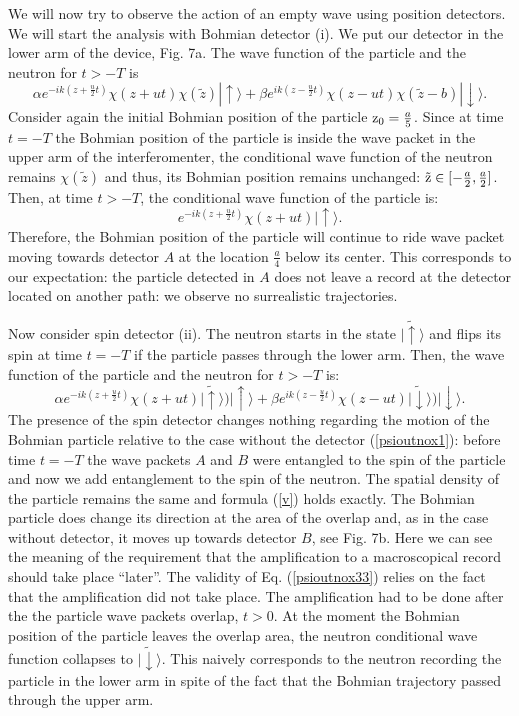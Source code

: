 \documentclass[12pt,preprint,tightenlines]{elsarticle}
\begin{document}
We will now try to observe the action of an empty wave using position
detectors. We will start the analysis with Bohmian detector (i). We
put our detector in the lower arm of the device, Fig. 7a. The wave
function of the particle and the neutron for $t>-T$ is
\begin{equation}
\alpha e^{-ik(z+\frac{u}{2}t)}\chi(z+ut)\chi(\tilde{z})|\uparrow\rangle+\beta e^{ik(z-\frac{u}{2}t)}\chi(z-ut)\chi(\tilde{z}-b)|\downarrow\rangle.\label{psioutnox2}
\end{equation}
 Consider again the initial Bohmian position of the particle ${\rm z_{0}}=\frac{a}{5}$.
Since at time $t=-T$ the Bohmian position of the particle is inside
the  wave packet in the upper arm of the interferomenter, the conditional wave function of the neutron
remains $\chi(\tilde{z})$ and thus, its Bohmian position remains
unchanged: ${\rm \tilde{z}}\in[-\frac{a}{2},\frac{a}{2}]$. Then,
at time $t>-T$, the conditional wave function of the particle is:
\begin{equation}
e^{-ik(z+\frac{u}{2}t)}\chi(z+ut)|\uparrow\rangle.\label{psiout55}
\end{equation}
 Therefore, the Bohmian position of the particle will continue to
ride wave packet moving towards detector $A$ at the location $\frac{a}{4}$ below its center. This corresponds to our expectation: the particle
detected in $A$ does not leave a record at the detector located on
another path: we observe no surrealistic trajectories.


Now consider spin detector (ii). The neutron starts in the state $|\tilde{\uparrow}\rangle$ and
flips its spin at time $t=-T$ if the particle passes through the lower arm. Then, the wave function of the particle and the neutron for
$t>-T$ is:
 \begin{equation}
\alpha e^{-ik(z+\frac{u}{2}t)}\chi(z+ut)|\tilde{\uparrow}\rangle)|\uparrow\rangle+\beta e^{ik(z-\frac{u}{2}t)}\chi(z-ut)|\tilde{\downarrow}\rangle)|\downarrow\rangle.\label{psioutnox33}
\end{equation}
 The presence of the spin detector changes nothing regarding the motion
of the Bohmian particle relative to the case without the detector (\ref{psioutnox1}):
before time $t=-T$ the wave packets $A$ and $B$ were entangled
to the spin of the particle and now we add entanglement to the spin
of the neutron. The spatial density of the particle remains the same
and formula (\ref{v}) holds exactly. The Bohmian particle does change
its direction at the area of the overlap and, as in
the case without detector, it moves up towards
detector $B$, see Fig. 7b.  Here we can see the meaning of the requirement that the amplification to a macroscopical record should take place ``later''. The validity of Eq. (\ref{psioutnox33}) relies on the fact that the amplification did not take place. The amplification had to be done after the   the particle wave packets overlap,  $t>0$. At the moment the Bohmian position of the particle leaves the overlap area, 
the neutron conditional wave function collapses to $|\tilde{\downarrow}\rangle$. This naively corresponds to the neutron recording the particle in 
the lower arm in spite of the fact that the Bohmian trajectory passed through the
upper arm.
\end{document}
